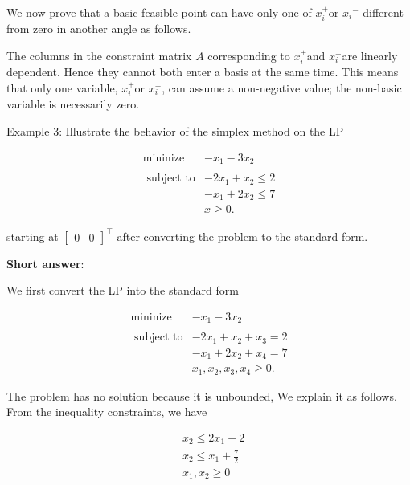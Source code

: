 We now prove that a basic feasible point can have only one of \(x_{i}^{+}\)or \(x_{i}{ }^{-}\) different from zero in another angle as follows.

The columns in the constraint matrix \(A\) corresponding to \(x_{i}^{+}\)and \(x_{i}^{-}\)are linearly dependent. Hence they cannot both enter a basis at the same time. This means that only one variable, \(x_{i}^{+}\)or \(x_{i}^{-}\), can assume a non-negative value; the non-basic variable is necessarily zero.

\medskip
\noindent
Example 3: Illustrate the behavior of the simplex method on the LP

\[
	\begin{array}{rl}
		\operatorname{mininize} & -x_{1}-3 x_{2} \\
		& \\
		\text { subject to} & -2 x_{1}+x_{2} \leq 2 \\
		& -x_{1}+2 x_{2} \leq 7 \\
		& x \geq 0.
	\end{array}
\]

starting at \(\left[\begin{array}{ll}0 & 0\end{array}\right]^{\top}\) after converting the problem to the standard form.

\textbf{Short answer}:

We first convert the LP into the standard form

\[
	\begin{array}{rl}
		\operatorname{mininize} & -x_{1}-3 x_{2} \\
		& \\
		\text { subject to} & -2 x_{1}+x_{2}+x_{3}=2 \\
		& -x_{1}+2 x_{2}+x_{4}=7 \\
		& x_{1}, x_{2}, x_{3}, x_{4} \geq 0 .
	\end{array}
\]


The problem has no solution because it is unbounded, We explain it as follows. From the inequality constraints, we have

\begin{equation*}
	\begin{aligned}
		& x_{2} \leq 2 x_{1}+2 \\
		& x_{2} \leq x_{1}+\frac{7}{2} \\
		& x_{1}, x_{2} \geq 0
	\end{aligned}
\end{equation*}

